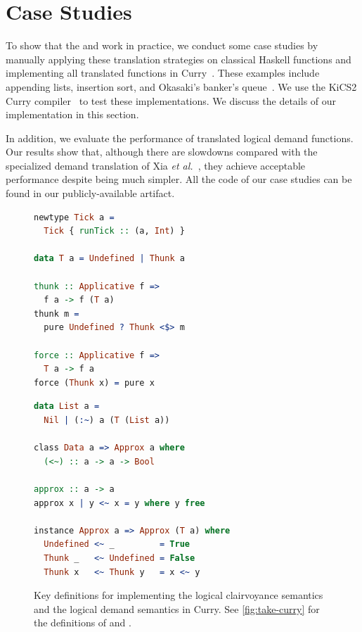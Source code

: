 \section{Case Studies}\label{sec:case-study}

To show that the \transCname{} and \transDname{} work in practice, we conduct
some case studies by manually applying these translation strategies on classical
Haskell functions and implementing all translated functions in
Curry~\cite{curry-lang}. These examples include appending lists, insertion sort,
and Okasaki's banker's queue~\cite{purely-functional}. We use the KiCS2 Curry
compiler~\cite{kics2} to test these implementations. We discuss the details of
our implementation in this section.

In addition, we evaluate the performance of translated logical demand functions.
Our results show that, although there are slowdowns compared with the
specialized demand translation of Xia \textit{et al.}~\cite{demand-semantics},
they achieve acceptable performance despite being much simpler. All the code of
our case studies can be found in our publicly-available artifact.

\begin{figure}[t]
\begin{minipage}[b]{0.4\textwidth}
\begin{lstlisting}[language=Curry]
newtype Tick a =
  Tick { runTick :: (a, Int) }

data T a = Undefined | Thunk a

thunk :: Applicative f =>
  f a -> f (T a)
thunk m =
  pure Undefined ? Thunk <$> m

force :: Applicative f =>
  T a -> f a
force (Thunk x) = pure x
\end{lstlisting}
\end{minipage}
\qquad
\begin{minipage}[b]{0.5\textwidth}
\begin{lstlisting}[language=Curry]
data List a =
  Nil | (:~) a (T (List a))
  
class Data a => Approx a where
  (<~) :: a -> a -> Bool

approx :: a -> a
approx x | y <~ x = y where y free
  
instance Approx a => Approx (T a) where
  Undefined <~ _         = True
  Thunk _   <~ Undefined = False
  Thunk x   <~ Thunk y   = x <~ y
\end{lstlisting}
\end{minipage}
\caption{Key definitions for implementing the logical clairvoyance semantics and
  the logical demand semantics in Curry. See \cref{fig:take-curry} for the
  definitions of  and .}\label{fig:curry-foundations}
\end{figure}

